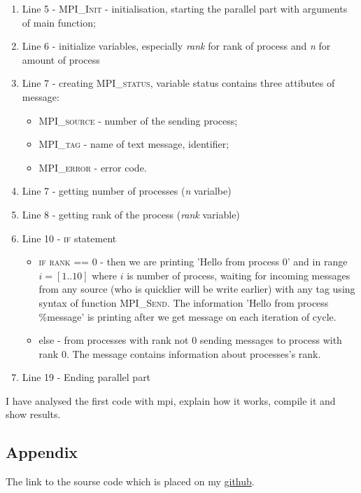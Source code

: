 \documentclass[%
12pt, %
final, %
oneside, %
onecolumn, %
centertags]{article} %
\theoremstyle{plain}
\theoremstyle{definition}
\theoremstyle{remark}
\begin{document}
\begin{enumerate}
	\item Line 5 - \textsc{MPI\_Init} - initialisation, starting the parallel part with arguments of main function;
	\item Line 6 - initialize variables, especially \textit{rank} for rank of process and \textit{n} for amount of process
	\item Line 7 - creating \textsc{MPI\_status}, variable status contains three attibutes of message:
	\begin{itemize}
		\item \textsc{MPI\_source} - number of the sending process;
		\item \textsc{MPI\_tag} - name of text message, identifier;
		\item \textsc{MPI\_error} - error code.
	\end{itemize}
	\item Line 7 - getting number of processes (\textit{n} varialbe)
	\item Line 8 - getting rank of the process (\textit{rank} variable)
	\item Line 10 - \textsc{if} statement
	\begin{itemize}
		\item \textsc{if rank == 0} - then we are printing 'Hello from process 0' and in range $i=[1..10]$ where $i$ is number of process, waiting for incoming messages from any source (who is quicklier will be write earlier) with any tag using syntax of function \textsc{MPI\_Send}. The information 'Hello from process \%message' is printing after we get message on each iteration of cycle.
		\item else - from processes with rank not $0$ sending messages to process with rank $0$. The message contains information about processes's rank.
	\end{itemize}
	\item Line 19 - Ending parallel part
\end{enumerate}

I have analysed the first code with mpi, explain how it works, compile it and show results.



\subsection{Appendix}

The link to the sourse code which is placed on my \href{https://github.com/aptmess/parallel_algorithms}{github}.
\end{document}
